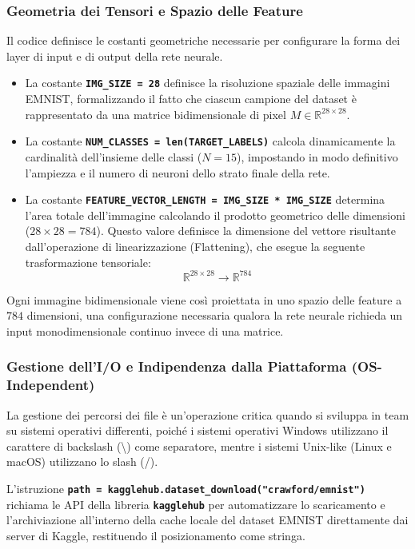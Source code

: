 \documentclass[12pt,a4paper]{article}
\begin{document}
    \subsubsection{Geometria dei Tensori e Spazio delle Feature}
    Il codice definisce le costanti geometriche necessarie per configurare la forma dei layer di input e di output della rete neurale. \newline
    \begin{itemize}
        \item La costante \textbf{\texttt{IMG\_SIZE = 28}} definisce la risoluzione spaziale delle immagini EMNIST, formalizzando il fatto che ciascun campione del dataset è rappresentato da una matrice bidimensionale di pixel $M \in \mathbb{R}^{28 \times 28}$. \newline
        \item La costante \textbf{\texttt{NUM\_CLASSES = len(TARGET\_LABELS)}} calcola dinamicamente la cardinalità dell'insieme delle classi ($N = 15$), impostando in modo definitivo l'ampiezza e il numero di neuroni dello strato finale della rete. \newline
        \item La costante \textbf{\texttt{FEATURE\_VECTOR\_LENGTH = IMG\_SIZE * IMG\_SIZE}} determina l'area totale dell'immagine calcolando il prodotto geometrico delle dimensioni ($28 \times 28 = 784$). Questo valore definisce la dimensione del vettore risultante dall'operazione di linearizzazione (Flattening), che esegue la seguente trasformazione tensoriale:
    $$\mathbb{R}^{28 \times 28} \longrightarrow \mathbb{R}^{784}$$
    \end{itemize}
    Ogni immagine bidimensionale viene così proiettata in uno spazio delle feature a $784$ dimensioni, una configurazione necessaria qualora la rete neurale richieda un input monodimensionale continuo invece di una matrice.

    \subsubsection{Gestione dell'I/O e Indipendenza dalla Piattaforma (OS-Independent)}
    La gestione dei percorsi dei file è un'operazione critica quando si sviluppa in team su sistemi operativi differenti, poiché i sistemi operativi Windows utilizzano il carattere di backslash (\textbackslash) come separatore, mentre i sistemi Unix-like (Linux e macOS) utilizzano lo slash (/).
    \smallskip

    L'istruzione \textbf{\texttt{path = kagglehub.dataset\_download("crawford/emnist")}} richiama le API della libreria \textbf{\texttt{kagglehub}} per automatizzare lo scaricamento e l'archiviazione all'interno della cache locale del dataset EMNIST direttamente dai server di Kaggle, restituendo il posizionamento come stringa.
    \smallskip
\end{document}
